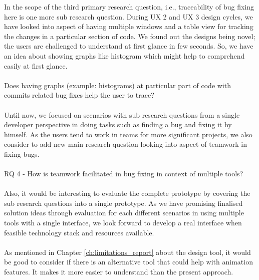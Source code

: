 In the scope of the third primary research question, i.e., traceability of bug fixing here is one more sub research question.  During UX 2 and UX 3 design cycles, we have looked into aspect of having multiple windows and a table view for tracking the changes in a particular section of code. We found out the designs being novel; the users are challenged to understand at first glance in few seconds. So, we have an idea about showing graphs like histogram which might help to comprehend easily at first glance. \\ \\
\noindent Does having graphs (example: histograms) at particular part of code with commits related bug fixes help the user to trace? \\ \\

Until now, we focused on scenarios with sub research questions from a single developer perspective in doing tasks such as finding a bug and fixing it by himself. As the users tend to work in teams for more significant projects, we also consider to add new main research question looking into aspect of teamwork in fixing bugs. \\ \\
\noindent RQ 4 - How is teamwork facilitated in bug fixing in context of multiple tools? \\ \\

Also, it would be interesting to evaluate the complete prototype by covering the sub research questions into a single prototype. As we have promising finalised solution ideas through evaluation for each different scenarios in using multiple tools with a single interface, we look forward to develop a real interface when feasible technology stack and resources available. \\ \\

As mentioned in Chapter \ref{ch:limitations_report} about the design tool, it would be good to consider if there is an alternative tool that could help with animation features. It makes it more easier to understand than the present approach.